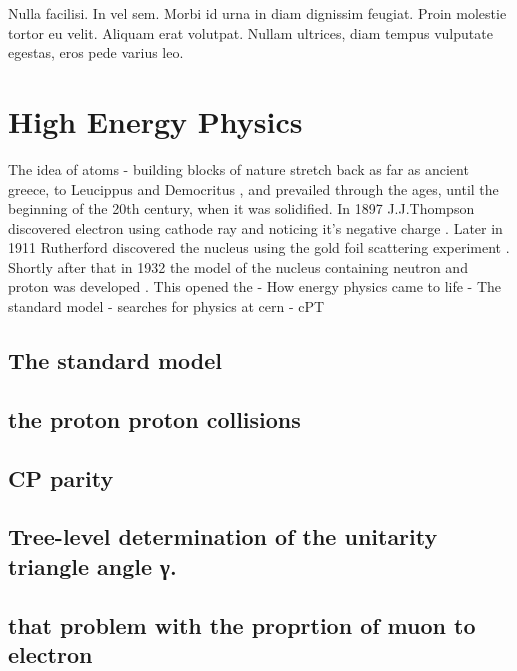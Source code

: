 \begin{savequote}[75mm]
Nulla facilisi. In vel sem. Morbi id urna in diam dignissim feugiat. Proin molestie tortor eu velit. Aliquam erat volutpat. Nullam ultrices, diam tempus vulputate egestas, eros pede varius leo.
\end{savequote}

\chapter{High Energy Physics}

The idea of atoms - building blocks of nature stretch back as far as ancient greece, to Leucippus and Democritus \cite{10.3138/9781442671102}, and prevailed through the ages, until the beginning of the 20th century, when it was solidified. In 1897 J.J.Thompson discovered electron using cathode ray and noticing it's negative charge \cite{thomson1901bodies}.  Later in 1911 Rutherford discovered the nucleus using the gold foil scattering experiment \cite{doi:10.1080/14786440508637080}. Shortly after that in 1932 the model of the nucleus containing neutron and proton was developed \cite{Iwanenko1932TheNH} \cite{1932ZPhy...77....1H}. This opened the 
- How energy physics came to life
- The standard model
- searches for physics at cern 
- cPT

\section{The standard model}

\section{the proton proton collisions}
\section{CP parity}
\section{Tree-level determination of the unitarity triangle angle γ.}
\section{that problem with the proprtion of muon to electron}

